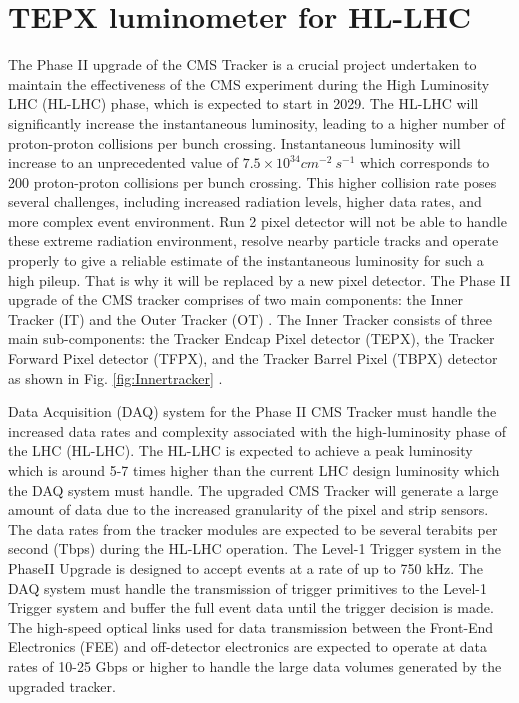 \chapter{TEPX luminometer for HL-LHC}  %

\ifpdf
    \graphicspath{{Chapter7/Figs/Raster/}{Chapter7/Figs/PDF/}{Chapter7/Figs/}}
\else
    \graphicspath{{Chapter7/Figs/Vector/}{Chapter7/Figs/}}
\fi

The Phase II upgrade of the CMS Tracker is a crucial project undertaken to maintain the effectiveness of the CMS experiment during the High Luminosity LHC (HL-LHC) phase, which is expected to start in 2029. The HL-LHC will significantly increase the instantaneous luminosity, leading to a higher number of proton-proton collisions per bunch crossing. Instantaneous luminosity will increase to an unprecedented value of $7.5 \times 10^{34} cm^{-2} \: s^{-1}$ which corresponds to 200 proton-proton collisions per bunch crossing. This higher collision rate poses several challenges, including increased radiation levels, higher data rates, and more complex event environment. Run 2 pixel detector will not be able to handle these extreme radiation environment, resolve nearby particle tracks and operate properly to give a reliable estimate of the instantaneous luminosity for such a high pileup. That is why it will be replaced by a new pixel detector. The Phase II upgrade of the CMS tracker comprises of two main components: the Inner Tracker (IT) and the Outer Tracker (OT) \cite{collaboration:2759074}. The Inner Tracker consists of three main sub-components: the Tracker Endcap Pixel detector (TEPX), the Tracker Forward Pixel detector (TFPX), and the Tracker Barrel Pixel (TBPX) detector as shown in Fig. \ref{fig:Innertracker} \cite{CERN-LHCC-2017-009}.  %

Data Acquisition (DAQ) system for the Phase II CMS Tracker must handle the increased data rates and complexity associated with the high-luminosity phase of the LHC (HL-LHC). The HL-LHC is expected to achieve a peak luminosity which is around 5-7 times higher than the current LHC design luminosity which the DAQ system must handle. The upgraded CMS Tracker will generate a large amount of data due to the increased granularity of the pixel and strip sensors. The data rates from the tracker modules are expected to be several terabits per second (Tbps) during the HL-LHC operation. The Level-1 Trigger system in the PhaseII Upgrade is designed to accept events at a rate of up to 750 kHz. The DAQ system must handle the transmission of trigger primitives to the Level-1 Trigger system and buffer the full event data until the trigger decision is made. The high-speed optical links used for data transmission between the Front-End Electronics (FEE) and off-detector electronics are expected to operate at data rates of 10-25 Gbps or higher to handle the large data volumes generated by the upgraded tracker.

